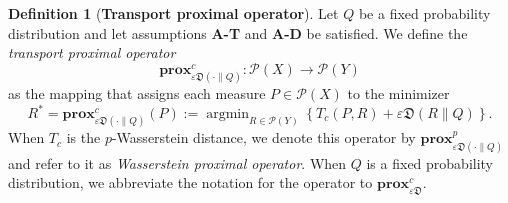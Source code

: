 \documentclass{amsart}
\theoremstyle{definition}
\newtheorem{definition}[theorem]{Definition}
\theoremstyle{remark}
\numberwithin{equation}{section}
\DeclareMathOperator*{\argmin}{argmin}
\begin{document}
\begin{definition}[\bf Transport proximal operator]\label{def:  Transport proximal operator}
Let $Q$ be a fixed probability distribution and let assumptions {\bf A-T} and {\bf A-D} be satisfied. We define the \emph{transport proximal operator} 
\begin{equation}
\textbf{prox}^c_{\varepsilon \mathfrak{D}(\cdot\|Q)}: \mathcal{P}(X) \to \mathcal{P}(Y)
\end{equation}
as the mapping that assigns each measure $P\in\mathcal{P}(X)$ to the minimizer
\begin{equation}\label{def:Transport proximal operator}
    R^* = \textbf{prox}^c_{\varepsilon \mathfrak{D}(\cdot\|Q)}(P) :=  \argmin_{R\in \mathcal{P}(Y)}\left\{T_c(P,R) + \varepsilon \mathfrak{D}(R\|Q)  \right\}.
\end{equation}
When $T_c$ is the $p$-Wasserstein distance, we denote this operator by $\textbf{prox}^p_{\varepsilon \mathfrak{D}(\cdot\|Q)}$ and refer to it as \emph{Wasserstein proximal operator}. When $Q$ is a fixed probability distribution, we abbreviate the notation for the operator to $\textbf{prox}^c_{\varepsilon \mathfrak{D}}$.
\end{definition}
\end{document}
